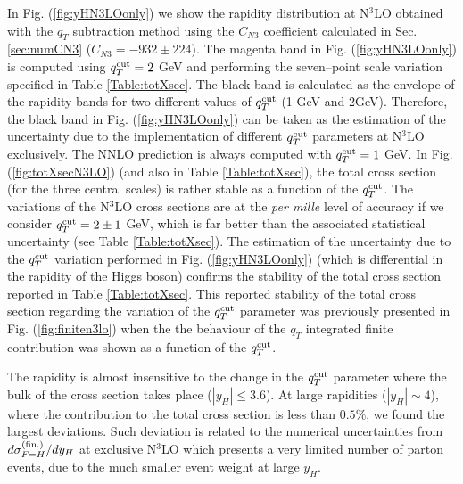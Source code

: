 \documentclass[12pt]{article}
\begin{document}
In Fig. (\ref{fig:yHN3LOonly}) we show the rapidity distribution at N$^{3}$LO obtained with the $q_{T}$ subtraction method using the $C_{N3}$ coefficient calculated in Sec. \ref{sec:numCN3} ($C_{N3}=-932 \pm 224$). The magenta band in Fig. (\ref{fig:yHN3LOonly}) is computed using $q_{T}^{\rm cut}=2$ GeV and performing the seven--point scale variation specified in Table \ref{Table:totXsec}. The black band is calculated as the envelope of the rapidity bands for two different values of $q_{T}^{\rm cut}$ (1 GeV and 2GeV). Therefore, the black band in Fig. (\ref{fig:yHN3LOonly}) can be taken as the estimation of the uncertainty due to the implementation of different $q_{T}^{\rm cut}$ parameters at N$^{3}$LO exclusively. The NNLO prediction is always computed with $q_{T}^{\rm cut}=1$ GeV. In Fig. (\ref{fig:totXsecN3LO}) (and also in Table \ref{Table:totXsec}), the total cross section (for the three central scales) is rather stable as a function of the $q_{T}^{\rm cut}$. The variations of the N$^{3}$LO cross sections are at the \textit{per mille} level of accuracy if we consider  $q_{T}^{\rm cut}=2 \pm 1$ GeV, which is far better than the associated statistical uncertainty (see Table \ref{Table:totXsec}). The estimation of the uncertainty due to the $q_{T}^{\rm cut}$ variation performed in Fig. (\ref{fig:yHN3LOonly}) (which is differential in the rapidity of the Higgs boson) confirms the stability of the total cross section reported in Table \ref{Table:totXsec}. This reported stability of the total cross section regarding the variation of the $q_{T}^{\rm cut}$ parameter was previously presented in Fig. (\ref{fig:finiten3lo}) when the the behaviour of the $q_{T}$ integrated finite contribution was shown as a function of the $q_{T}^{\rm cut}$.

The rapidity is almost insensitive to the change in the $q_{T}^{\rm cut}$ parameter where the bulk of the cross section takes place ($|y_{H}| \leq 3.6$). At large rapidities ($|y_{H}| \sim 4$), where the contribution to the total cross section is less than $0.5\%$, we found the largest deviations. Such deviation is related to the numerical uncertainties from $d\sigma_{F=H}^{(\rm fin.)}/dy_H$ at exclusive N$^3$LO which presents a very limited number of parton events, due to the much smaller event weight at large $y_H$.
\end{document}
